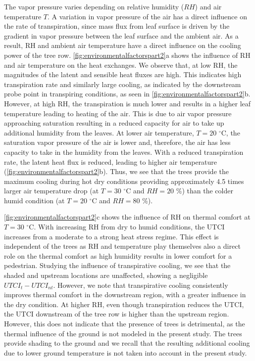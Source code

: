 The vapor pressure varies depending on relative humidity ($RH$) and air temperature $T$. A variation in vapor pressure of the air has a direct influence on the rate of transpiration, since mass flux from leaf surface is driven by the gradient in vapor pressure between the leaf surface and the ambient air. As a result, RH and ambient air temperature have a direct influence on the cooling power of the tree row. \cref{fig:environmentalfactorspart2}a shows the influence of RH and air temperature on the heat exchanges. We observe that, at low RH, the magnitudes of the latent and sensible heat fluxes are high. This indicates high transpiration rate and similarly large cooling, as indicated by the downstream probe point in transpiring conditions, as seen in \cref{fig:environmentalfactorspart2}b. However, at high RH, the transpiration is much lower and results in a higher leaf temperature leading to heating of the air. This is due to air vapor pressure approaching saturation resulting in a reduced capacity for air to take up additional humidity from the leaves. At lower air temperature, $T=20$ $^{\circ}$C, the saturation vapor pressure of the air is lower and, therefore, the air has less capacity to take in the humidity from the leaves. With a reduced transpiration rate, the latent heat flux is reduced, leading to higher air temperature (\cref{fig:environmentalfactorspart2}b). Thus, we see that the trees provide the maximum cooling during hot dry conditions providing approximately 4.5 times larger air temperature drop (at $T=30$ $^{\circ}$C and $\textit{RH}=20$ \%) than the colder humid condition (at $T=20$ $^{\circ}$C and $RH=80$ \%).

\cref{fig:environmentalfactorspart2}c shows the influence of RH on thermal comfort at $T=30$ $^{\circ}$C. With increasing RH from dry to humid conditions, the UTCI increases from a moderate to a strong heat stress regime. This effect is independent of the trees as RH and temperature play themselves also a direct role on the thermal comfort as high humidity results in lower comfort for a pedestrian. Studying the influence of transpirative cooling, we see that the shaded and upstream locations are unaffected, showing a negligible $\textit{UTCI}_t-\textit{UTCI}_{\textit{nt}}$. However, we note that transpirative cooling consistently improves thermal comfort in the downstream region, with a greater influence in the dry condition. At higher RH, even though transpiration reduces the UTCI, the UTCI downstream of the tree row is higher than the upstream region. However, this does not indicate that the presence of trees is detrimental, as the thermal influence of the ground is not modeled in the present study. The trees provide shading to the ground and we recall that the resulting additional cooling due to lower ground temperature is not taken into account in the present study. 


